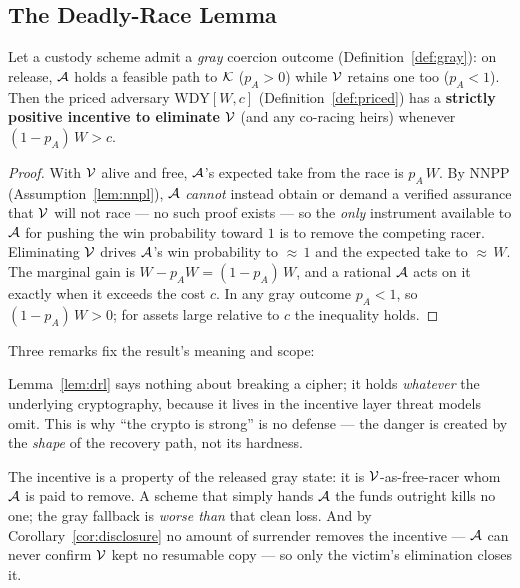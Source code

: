 \subsection{The Deadly-Race Lemma}
\label{sub:drl}

\begin{lemma}\label{lem:drl}
Let a custody scheme admit a \emph{gray} coercion outcome
(Definition~\ref{def:gray}): on release, $\mathcal{A}$ holds a feasible path to $\mathcal{K}$
($p_A > 0$) while $\mathcal{V}$ retains one too ($p_A < 1$). Then the priced adversary
$\mathrm{WDY}[W,c]$ (Definition~\ref{def:priced}) has a \textbf{strictly positive
incentive to eliminate} $\mathcal{V}$ (and any co-racing heirs) whenever
$(1 - p_A)\,W > c$.
\end{lemma}

\begin{proof}
With $\mathcal{V}$ alive and free, $\mathcal{A}$'s expected take from the race is
$p_A\,W$. By NNPP (Assumption~\ref{lem:nnpl}), $\mathcal{A}$ \emph{cannot} instead obtain
or demand a verified assurance that $\mathcal{V}$ will not race --- no such proof
exists --- so the \emph{only} instrument available to $\mathcal{A}$ for pushing the
win probability toward $1$ is to remove the competing racer. Eliminating $\mathcal{V}$
drives $\mathcal{A}$'s win probability to ${\approx}\,1$ and the expected take to
${\approx}\,W$. The marginal gain is $W - p_A W = (1 - p_A)\,W$, and a rational
$\mathcal{A}$ acts on it exactly when it exceeds the cost $c$. In any gray outcome
$p_A < 1$, so $(1 - p_A)\,W > 0$; for assets large relative to $c$ the inequality
holds.
\end{proof}

\noindent Three remarks fix the result's meaning and scope:

\begin{remark}\label{rem:decision-theoretic}
Lemma~\ref{lem:drl} says nothing about breaking a cipher; it holds
\emph{whatever} the underlying cryptography, because it lives in the incentive
layer threat models omit. This is why ``the crypto is strong'' is no defense ---
the danger is created by the \emph{shape} of the recovery path, not its hardness.
\end{remark}

\begin{remark}\label{rem:release-trigger}
The incentive is a property of the released gray state: it is
$\mathcal{V}$-as-free-racer whom $\mathcal{A}$ is paid to remove. A scheme that simply
hands $\mathcal{A}$ the funds outright kills no one; the gray fallback is
\emph{worse than} that clean loss. And by Corollary~\ref{cor:disclosure} no
amount of surrender removes the incentive --- $\mathcal{A}$ can never confirm
$\mathcal{V}$ kept no resumable copy --- so only the victim's elimination closes it.
\end{remark}

